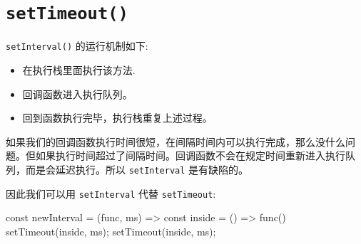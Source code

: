 \section{\texttt{setTimeout()}}

\texttt{setInterval()} 的运行机制如下: 
\begin{itemize}
  \item 在执行栈里面执行该方法.
  \item 回调函数进入执行队列。
  \item 回到函数执行完毕，执行栈重复上述过程。
\end{itemize}

如果我们的回调函数执行时间很短，在间隔时间内可以执行完成，那么没什么问题。但如果执行时间超过了间隔时间。回调函数不会在规定时间重新进入执行队列，而是会延迟执行。所以 \texttt{setInterval} 是有缺陷的。

因此我们可以用 \texttt{setInterval} 代替 \texttt{setTimeout}:

\begin{JavaScript}
const newInterval = (func, ms) => {
  const inside = () => {
    func()
    setTimeout(inside, ms);
  }
  setTimeout(inside, ms);
}
\end{JavaScript}
